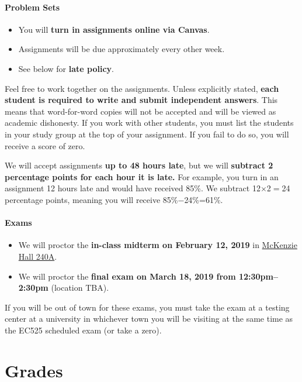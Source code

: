 \documentclass[10pt]{article}
\begin{document}
\paragraph{Problem Sets}
\begin{itemize}
  \item You will \textbf{turn in assignments online via Canvas}.
  \item Assignments will be due approximately every other week.
  \item See below for \textbf{late policy}.
\end{itemize}
Feel free to work together on the assignments. Unless explicitly stated, \textbf{each student is required to write and submit independent answers}. This means that word-for-word copies will not be accepted and will be viewed as academic dishonesty. If you work with other students, you must list the students in your study group at the top of your assignment. If you fail to do so, you will receive a score of zero.

We will accept assignments \textbf{up to 48 hours late}, but we will \textbf{subtract 2 percentage points for each hour it is late.} For example, you turn in an assignment 12 hours late and would have received 85\%. We subtract 12$\times$2$=$24 percentage points, meaning you will receive 85\%$-$24\%=61\%.

\paragraph{Exams}
\begin{itemize}
  \item We will proctor the \textbf{in-class midterm on February 12, 2019} in \href{https://map.uoregon.edu/c721c7d95}{McKenzie Hall 240A}.
  \item We will proctor the \textbf{final exam on March 18, 2019 from 12:30pm--2:30pm} (location TBA).
\end{itemize}
If you will be out of town for these exams, you must take the exam at a testing center at a university in whichever town you will be visiting at the same time as the EC525 scheduled exam (or take a zero).

\section*{Grades}
\end{document}
